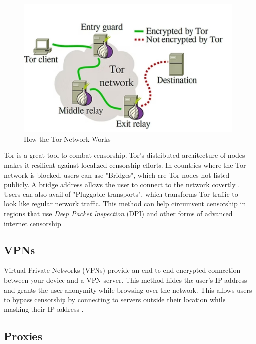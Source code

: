 \begin{figure}[H]
    \centering
    \includegraphics[width=\textwidth]{Griff/TCD SCSS CAPSTONE/Literature Review/Screenshot_13-4-2025_133514_static.wixstatic.com.jpeg}
    \caption{How the Tor Network Works \cite{HowTheTorNetworkWorks}}
    \label{fig:how-the-tor-network-works}
\end{figure}

Tor is a great tool to combat censorship. Tor's distributed architecture of nodes makes it resilient against localized censorship efforts. In countries where the Tor network is blocked, users can use "Bridges", which are Tor nodes not listed publicly. A bridge address allows the user to connect to the network covertly \cite{torprojectBRIDGESProject}. Users can also avail of "Pluggable transports", which transforms Tor traffic to look like regular network traffic. This method can help circumvent censorship in regions that use \textit{Deep Packet Inspection} (DPI) and other forms of advanced internet censorship \cite{torprojectCIRCUMVENTIONProject}.

\subsection{VPNs}

Virtual Private Networks (VPNs) provide an end-to-end encrypted connection between your device and a VPN server. This method hides the user's IP address and grants the user anonymity while browsing over the network. This allows users to bypass censorship by connecting to servers outside their location while masking their IP address \cite{TomsGuideVPN}.

\subsection{Proxies}

